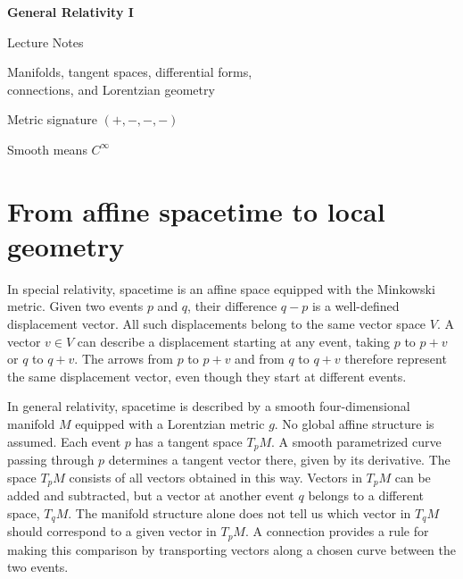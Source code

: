 \documentclass[11pt,a4paper]{article}
\numberwithin{equation}{section}
\newcommand{\slideref}[1]{\par\nobreak\smallskip\nobreak{\footnotesize\color{ink!60}\textsc{Source slide #1}}\par\nobreak\smallskip\nobreak}
\begin{document}
\hypersetup{pageanchor=false}
\begin{titlepage}
\centering
\vspace*{2.2cm}
{\Huge\bfseries\color{vuBurgundy}General Relativity I\par}
\vspace{0.45cm}
{\LARGE\color{vuBurgundy}Lecture Notes\par}
\vspace{0.8cm}
{\large Manifolds, tangent spaces, differential forms,\\[0.25em]
connections, and Lorentzian geometry\par}
\vfill
{\small Metric signature \((+,-,-,-)\)\par}
\vspace{0.35cm}
{\small Smooth means \(C^\infty\)\par}
\end{titlepage}
\hypersetup{pageanchor=true}
\tableofcontents
\clearpage
{}

\section{From affine spacetime to local geometry}
\label{sec:opening}
\slideref{1}

In special relativity, spacetime is an affine space equipped with the
Minkowski metric. Given two events \(p\) and \(q\), their difference \(q-p\)
is a well-defined displacement vector. All such displacements belong to
the same vector space \(V\). A vector \(v\in V\) can describe a displacement
starting at any event, taking \(p\) to \(p+v\) or \(q\) to \(q+v\). The
arrows from \(p\) to \(p+v\) and from \(q\) to \(q+v\) therefore represent
the same displacement vector, even though they start at different events.

In general relativity, spacetime is described by a smooth four-dimensional
manifold \(M\) equipped with a Lorentzian metric \(g\). No global affine
structure is assumed. Each event \(p\) has a tangent space \(T_pM\).
A smooth parametrized curve passing through \(p\) determines a tangent
vector there, given by its derivative. The space \(T_pM\) consists of all
vectors obtained in this way. Vectors in \(T_pM\) can be added and
subtracted, but a vector at another event \(q\) belongs to a different
space, \(T_qM\). The manifold structure alone does not tell us which vector
in \(T_qM\) should correspond to a given vector in \(T_pM\). A connection
provides a rule for making this comparison by transporting vectors along
a chosen curve between the two events.
\end{document}
